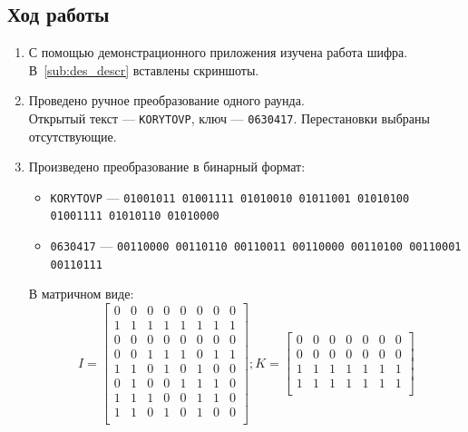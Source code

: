 \documentclass[a4paper, 14pt]{extarticle}
\begin{document}
\subsection{Ход работы}
\begin{enumerate}
    \item С помощью демонстрационного приложения изучена работа шифра. В~\ref{sub:des_descr} вставлены скриншоты.
    \item Проведено ручное преобразование одного раунда.\\
    Открытый текст --- \texttt{KORYTOVP}, ключ --- \texttt{0630417}. Перестановки выбраны отсутствующие.
    \item Произведено преобразование в бинарный формат:
    \begin{itemize}
        \item \texttt{KORYTOVP} --- \texttt{01001011 01001111 01010010 01011001 01010100 01001111 01010110 01010000}
        \item \texttt{0630417} --- \texttt{00110000 00110110 00110011 00110000 00110100 00110001 00110111}\\
    \end{itemize}
    В матричном виде:
    \begin{equation}%
        \label{eq:input}
        I = \begin{bmatrix}
            0   & 0   & 0   & 0   & 0   & 0   & 0   & 0   \\
            1   & 1   & 1   & 1   & 1   & 1   & 1   & 1   \\
            0   & 0   & 0   & 0   & 0   & 0   & 0   & 0   \\
            0   & 0   & 1   & 1   & 1   & 0   & 1   & 1   \\
            1   & 1   & 0   & 1   & 0   & 1   & 0   & 0   \\
            0   & 1   & 0   & 0   & 1   & 1   & 1   & 0   \\
            1   & 1   & 1   & 0   & 0   & 1   & 1   & 0   \\
            1   & 1   & 0   & 1   & 0   & 1   & 0   & 0   \\
        \end{bmatrix}; K = \begin{bmatrix}
            0   & 0   & 0   & 0   & 0   & 0   & 0   \\
            0   & 0   & 0   & 0   & 0   & 0   & 0   \\
            1   & 1   & 1   & 1   & 1   & 1   & 1   \\
            1   & 1   & 1   & 1   & 1   & 1   & 1   \\

\end{bmatrix}
\end{equation}
\end{enumerate}
\end{document}
